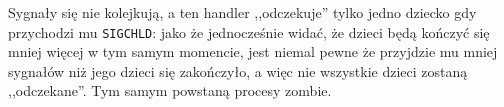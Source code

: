 Sygnały się nie kolejkują, a ten handler ,,odczekuje'' tylko jedno dziecko gdy przychodzi mu \texttt{SIGCHLD}: jako że jednocześnie widać, że dzieci będą kończyć się mniej więcej w tym samym momencie, jest niemal pewne że przyjdzie mu mniej sygnałów niż jego dzieci się zakończyło, a więc nie wszystkie dzieci zostaną ,,odczekane''. Tym samym powstaną procesy zombie. 